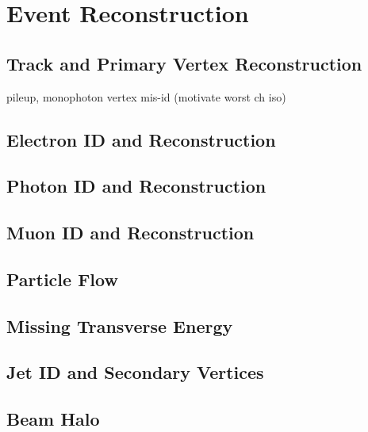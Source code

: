 
\chapter{Event Reconstruction}\label{sec:reconstruction}

\section{Track and Primary Vertex Reconstruction}
 pileup, monophoton vertex mis-id (motivate worst ch iso)

\section{Electron ID and Reconstruction}

\section{Photon ID and Reconstruction}

\section{Muon ID and Reconstruction}

\section{Particle Flow}

\section{Missing Transverse Energy}

\section{Jet ID and Secondary Vertices}

\section{Beam Halo}

